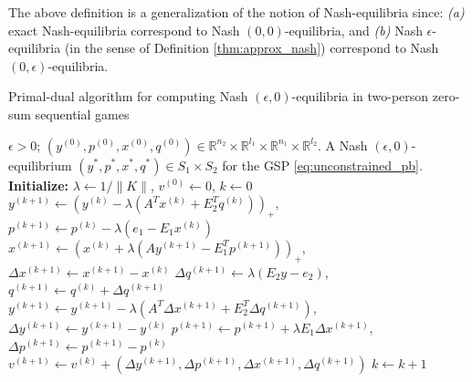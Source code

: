 \documentclass[a4paper,9pt]{extarticle}
\begin{document}
The above definition is a generalization of the notion of
Nash-equilibria since: \textit{(a)} exact Nash-equilibria correspond
to Nash $(0,0)$-equilibria, and \textit{(b)} Nash
$\epsilon$-equilibria (in the sense of Definition
\ref{thm:approx_nash}) correspond to Nash $(0,\epsilon)$-equilibria.

\begin{algorithm}
\caption{Primal-dual algorithm for computing Nash $(\epsilon,
  0)$-equilibria in two-person zero-sum sequential games}
\label{Tab:algo}
\begin{algorithmic}[1]
\Require $\epsilon > 0$; $(y^{(0)},p^{(0)},x^{(0)},q^{(0)}) \in \mathbb{R}^{n_2}
  \times \mathbb{R}^{l_1} \times \mathbb{R}^{n_1} \times
  \mathbb{R}^{l_2}$.
\Ensure A Nash $(\epsilon,0)$-equilibrium
$({y^*},{p^*},{x^*},{q^*}) \in S_1 \times S_2$ for
the GSP \eqref{eq:unconstrained_pb}.
\State  \textbf{Initialize:} $\lambda \leftarrow 1/\|K\|$, ${v}^{(0)}
\leftarrow 0$, $k \leftarrow 0$
\State $y^{(k + 1)} \leftarrow (y^{(k)} - \lambda (A^Tx^{(k)} +
E_2^Tq^{(k)}))_+$, \hspace{.5em}$p^{(k+1)} \leftarrow p^{(k)} -
\lambda(e_1-E_1x^{(k)})$
\State $x^{(k + 1)} \leftarrow (x^{(k)} + \lambda (Ay^{(k+1)} -
E_1^Tp^{(k+1)}))_+$, \hspace{.5em}$\Delta x^{(k+1)} \leftarrow
x^{(k+1)}-x^{(k)}$
\State $\Delta q^{(k+1)} \leftarrow \lambda (E_2y -
e_2)$, \hspace{.5em}$q^{(k+1)} \leftarrow q^{(k)} + \Delta q^{(k+1)}$
\State $y^{(k+1)} \leftarrow y^{(k+1)} - \lambda (A^T\Delta x^{(k+1)}
+ E_2^T\Delta q^{(k+1)})$, \hspace{.5em}$\Delta y^{(k+1)} \leftarrow
y^{(k+1)}-y^{(k)}$
\State $p^{(k+1)} \leftarrow p^{(k+1)} + \lambda E_1\Delta x^{(k+1)}$,
\hspace{.5em} $\Delta p^{(k+1)} \leftarrow p^{(k+1)}-p^{(k)}$
\State ${v}^{(k+1)} \leftarrow {v}^{(k)} + (\Delta
y^{(k+1)},\Delta p^{(k+1)},\Delta x^{(k+1)},\Delta q^{(k+1)})$ 
\State $k \leftarrow k + 1$
\EndWhile
\end{algorithmic}
\end{algorithm}
\end{document}
